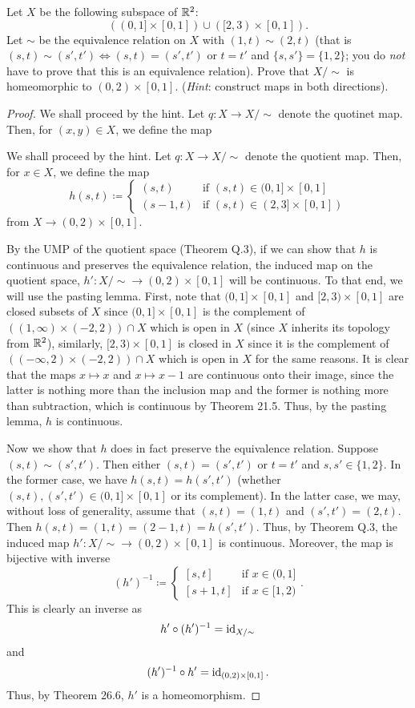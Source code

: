 \begin{problem}
Let $X$ be the following subspace of $\mathbb{R}^2$:
\[
((0,1]\times[0,1])\cup([2,3)\times[0,1]).
\]
Let $\sim$ be the equivalence relation on $X$ with $(1,t)\sim(2,t)$ (that
is $(s,t)\sim(s',t')\iff(s,t)=(s',t')$ or $t=t'$ and $\{s,s'\}=\{1,2\}$;
you do \emph{not} have to prove that this is an equivalence
relation). Prove that $X/{\sim}$ is homeomorphic to
$(0,2)\times[0,1]$. (\emph{Hint}: construct maps in both directions).
\end{problem}
\begin{proof}
We shall proceed by the hint. Let $q\colon X\to X/{\sim}$ denote the
quotinet map. Then, for $(x,y)\in X$, we define the map

We shall proceed by the hint. Let $q\colon X\to X/{\sim}$ denote the
quotient map. Then, for $x\in X$, we define the map
\[
h(s,t)\coloneqq
\begin{cases}
(s,t)&\text{if $(s,t)\in(0,1]\times[0,1]$}\\
(s-1,t)&\text{if $(s,t)\in(2,3]\times[0,1])$}
\end{cases}
\]
from $X\to(0,2)\times[0,1]$.

By the UMP of the quotient space (Theorem Q.3), if we can show that $h$ is
continuous and preserves the equivalence relation, the induced map on the
quotient space, $h'\colon X/{\sim}\to (0,2)\times[0,1]$ will be
continuous. To that end, we will use the pasting lemma. First, note that
$(0,1]\times[0,1]$ and $[2,3)\times[0,1]$ are closed subsets of $X$ since
$(0,1]\times[0,1]$ is the complement of $((1,\infty)\times (-2,2))\cap X$
which is open in $X$ (since $X$ inherits its topology from $\mathbb{R}^2$),
similarly, $[2,3)\times[0,1]$ is closed in $X$ since it is the complement
of $((-\infty,2)\times(-2,2))\cap X$ which is open in $X$ for the same
reasons. It is clear that the maps $x\mapsto x$ and $x\mapsto x-1$ are
continuous onto their image, since the latter is nothing more than the
inclusion map and the former is nothing more than subtraction, which is
continuous by Theorem 21.5. Thus, by the pasting lemma, $h$ is continuous.

Now we show that $h$ does in fact preserve the equivalence
relation. Suppose $(s,t)\sim(s',t')$. Then either $(s,t)=(s',t')$ or $t=t'$
and $s,s'\in\{1,2\}$. In the former case, we have $h(s,t)=h(s',t')$
(whether $(s,t),(s',t')\in(0,1]\times[0,1]$ or its complement). In the
latter case, we may, without loss of generality, assume that $(s,t)=(1,t)$
and $(s',t')=(2,t)$. Then $h(s,t)=(1,t)=(2-1,t)=h(s',t')$. Thus, by Theorem
Q.3, the induced map $h'\colon X/{\sim}\to(0,2)\times[0,1]$ is
continuous. Moreover, the map is bijective with inverse
\[
(h')^{-1}\coloneqq
\begin{cases}
[s,t]&\text{if $x\in (0,1]$}\\
[s+1,t]&\text{if $x\in [1,2)$}
\end{cases}.
\]
This is clearly an inverse as
\[
h'\circ (h')^{-1}=\operatorname{id}_{X/{\sim}}
\]
and
\[
(h')^{-1}\circ h'=\operatorname{id}_{(0,2)\times[0,1]}.
\]
Thus, by Theorem 26.6, $h'$ is a homeomorphism.
\end{proof}

